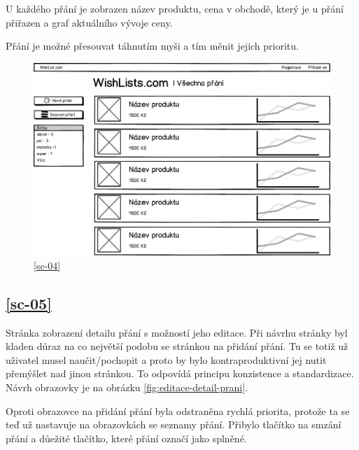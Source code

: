 U každého přání je zobrazen název produktu, cena v obchodě, který je u přání přiřazen a graf aktuálního vývoje ceny.

Přání je možné přesouvat táhnutím myši a tím měnit jejich prioritu.

\begin{figure}[htb]
\begin{center}
\includegraphics[width=130mm]{./pictures/mock/vsechna-prani.png}
\caption{\ref{sc-04}}
\label{fig:vsechna-prani}
\end{center}
\end{figure}

\subsection{\ref{sc-05}}
Stránka zobrazení detailu přání s možností jeho editace. Při návrhu stránky byl kladen důraz na co největší podobu se stránkou na přidání přání. Tu se totiž už uživatel musel naučit/pochopit a proto by bylo kontraproduktivní jej nutit přemýšlet nad jinou stránkou. To odpovídá principu konzistence a standardizace\cite{molich1990improving}. Návrh obrazovky je na obrázku \ref{fig:editace-detail-prani}.

Oproti obrazovce na přidání přání byla odstraněna rychlá priorita, protože ta se teď už nastavuje na obrazovkách se seznamy přání. Přibylo tlačítko na smzání přání a důežité tlačítko, které přání označí jako splněné.

